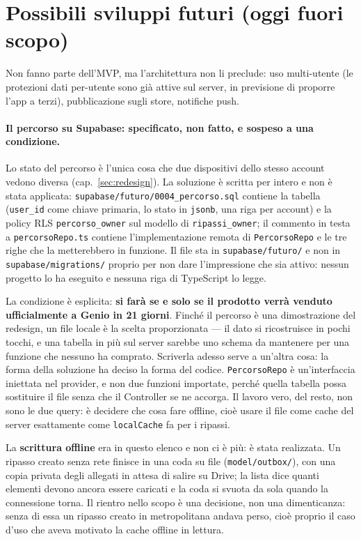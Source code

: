 \documentclass[11pt,a4paper]{report}
\begin{document}
\section{Possibili sviluppi futuri (oggi fuori scopo)}

Non fanno parte dell'MVP, ma l'architettura non li preclude: uso multi-utente
(le protezioni dati per-utente sono gi\`a attive sul server, in previsione di
proporre l'app a terzi), pubblicazione sugli store, notifiche push.

\paragraph{Il percorso su Supabase: specificato, non fatto, e sospeso a una
condizione.} Lo stato del percorso \`e l'unica cosa che due dispositivi dello
stesso account vedono diversa (cap.~\ref{sec:redesign}). La soluzione \`e
scritta per intero e non \`e stata applicata:
\texttt{supabase/futuro/0004\_percorso.sql} contiene la tabella
(\texttt{user\_id} come chiave primaria, lo stato in \texttt{jsonb}, una riga
per account) e la policy RLS \texttt{percorso\_owner} sul modello di
\texttt{ripassi\_owner}; il commento in testa a \texttt{percorsoRepo.ts}
contiene l'implementazione remota di \texttt{PercorsoRepo} e le tre righe che
la metterebbero in funzione. Il file sta in \texttt{supabase/futuro/} e non in
\texttt{supabase/migrations/} proprio per non dare l'impressione che sia
attivo: nessun progetto lo ha eseguito e nessuna riga di TypeScript lo legge.

La condizione \`e esplicita: \textbf{si far\`a se e solo se il prodotto verr\`a
venduto ufficialmente a Genio in 21 giorni}. Finch\'e il percorso \`e una
dimostrazione del redesign, un file locale \`e la scelta proporzionata --- il
dato si ricostruisce in pochi tocchi, e una tabella in pi\`u sul server
sarebbe uno schema da mantenere per una funzione che nessuno ha comprato.
Scriverla adesso serve a un'altra cosa: la forma della soluzione ha deciso la
forma del codice. \texttt{PercorsoRepo} \`e un'interfaccia iniettata nel
provider, e non due funzioni importate, perch\'e quella tabella possa
sostituire il file senza che il Controller se ne accorga. Il lavoro vero, del
resto, non sono le due query: \`e decidere che cosa fare offline, cio\`e usare
il file come cache del server esattamente come \texttt{localCache} fa per i
ripassi.

La \textbf{scrittura offline} era in questo elenco e non ci \`e pi\`u: \`e
stata realizzata. Un ripasso creato senza rete finisce in una coda su file
(\texttt{model/outbox/}), con una copia privata degli allegati in attesa di
salire su Drive; la lista dice quanti elementi devono ancora essere caricati e
la coda si svuota da sola quando la connessione torna. Il rientro nello scopo
\`e una decisione, non una dimenticanza: senza di essa un ripasso creato in
metropolitana andava perso, cio\`e proprio il caso d'uso che aveva motivato la
cache offline in lettura.
\end{document}
